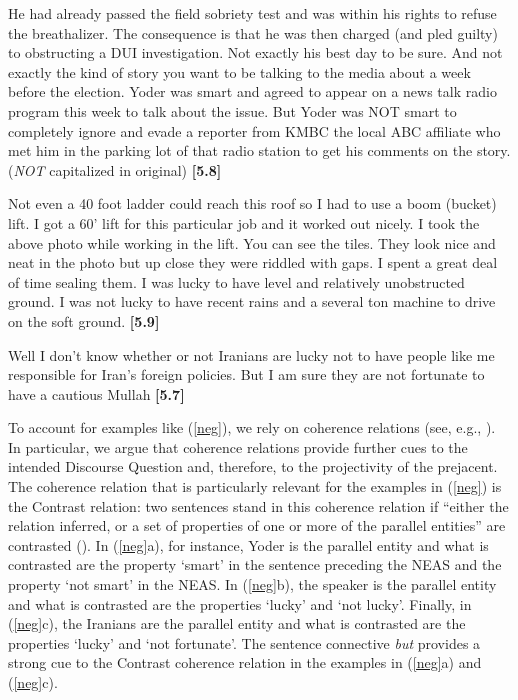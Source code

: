 \documentclass[11pt,fleqn]{article}
\newcommand{\6}{\mbox{$[\hspace*{-.6mm}[$}}
\newcommand{\9}{\mbox{$]\hspace*{-.6mm}]$}}
\begin{document}
\begin{exe} 
\ex\label{neg}

\begin{xlist}

\ex He had already passed the field sobriety test and was within his
rights to refuse the breathalizer. The consequence is that he was then
charged (and pled guilty) to obstructing a DUI investigation. Not
exactly his best day  to be sure. And not exactly the kind of story you
want to be talking to the media about a week before the election. Yoder
was smart and agreed to appear on a news talk radio program this week
to talk about the issue. But Yoder was NOT smart to completely
ignore and evade a reporter from KMBC  the local ABC affiliate  who met
him in the parking lot of that radio station to get his comments on the
story. \hfill ({\em NOT} capitalized in original) {\bf [5.8]}

\ex Not even a 40 foot ladder could reach this roof  so I had to use a
boom (bucket) lift. I got a 60' lift for this particular job  and it
worked out nicely. I took the above photo while working in the lift. You
can see the tiles. They look nice and neat in the photo  but up close 
they were riddled with gaps. I spent a great deal of time sealing them.
I was lucky to have level and relatively unobstructed ground. I was not
lucky to have recent rains and a several ton machine to drive on
the soft ground. \hfill {\bf [5.9]}

\ex Well I don't know whether or not Iranians are lucky not to have
people like me responsible for Iran's foreign policies. But I am sure
they are not fortunate to have a cautious Mullah \hfill {\bf
[5.7]}

\end{xlist}

\end{exe}

To account for examples like (\ref{neg}), we rely on coherence relations (see, e.g., \citealt{hobbs1985,mann-thompson1988,asher-lascarides2003,kehler2004}). In particular, we argue that coherence relations provide further cues to the intended Discourse Question and, therefore, to the projectivity of the prejacent. The coherence relation that  is particularly relevant for the examples in (\ref{neg}) is the Contrast relation:  two sentences stand in this coherence relation if ``either the relation inferred, or a set of properties of one or more of the parallel entities'' are contrasted (\citealt[432]{kehler00}). In (\ref{neg}a), for instance, Yoder is the parallel entity and what is contrasted are the property `smart' in the sentence preceding the NEAS and the property `not smart' in the NEAS. In (\ref{neg}b), the speaker is the parallel entity and what is contrasted are the properties `lucky' and `not lucky'. Finally, in (\ref{neg}c), the Iranians are the parallel entity and what is contrasted are the properties `lucky' and `not fortunate'. The sentence connective {\em but} provides a strong cue to the Contrast coherence relation in the examples in (\ref{neg}a) and (\ref{neg}c).  
\end{document}
